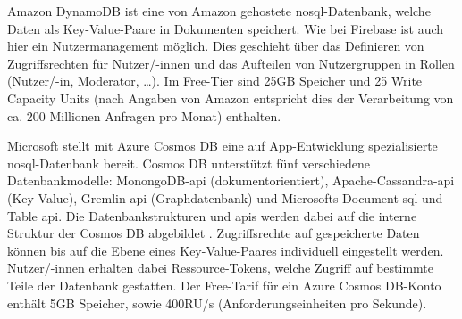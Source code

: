 Amazon DynamoDB \cite{misc:dynamodb} ist eine von Amazon gehostete \gls{nosql}-Datenbank, welche Daten als Key-Value-Paare in Dokumenten speichert. Wie bei Firebase ist auch hier ein
Nutzermanagement möglich. Dies geschieht über das Definieren von Zugriffsrechten für Nutzer/-innen und das Aufteilen von Nutzergruppen in Rollen (Nutzer/-in, Moderator, \dots). \newline
Im Free-Tier sind 25GB Speicher und 25 Write Capacity Units (nach Angaben von Amazon entspricht dies der Verarbeitung von ca. 200 Millionen Anfragen pro Monat) enthalten\cite{misc:amazonfreetier}.

Microsoft stellt mit Azure Cosmos DB \cite{misc:cosmosdb} eine auf App-Entwicklung spezialisierte \gls{nosql}-Datenbank bereit. Cosmos DB unterstützt fünf verschiedene Datenbankmodelle:
MonongoDB-\acrshort{api} (dokumentorientiert), Apache-Cassandra-\acrshort{api} (Key-Value), Gremlin-\acrshort{api} (Graphdatenbank) und Microsofts Document \gls{sql} und Table \acrshort{api}.
Die Datenbankstrukturen und \glspl{api} werden dabei auf die interne Struktur der Cosmos DB abgebildet \cite{misc:heise_cosmosdb}. Zugriffsrechte auf gespeicherte Daten können bis auf
die Ebene eines Key-Value-Paares individuell eingestellt werden. Nutzer/-innen erhalten dabei Ressource-Tokens, welche Zugriff auf bestimmte Teile der Datenbank gestatten. \newline
Der Free-Tarif für ein Azure Cosmos DB-Konto enthält 5GB Speicher, sowie 400RU/s (Anforderungseinheiten pro Sekunde).




